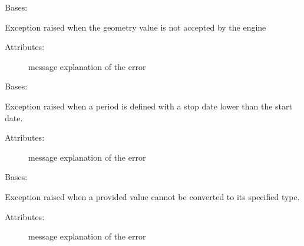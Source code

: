 \begin{fulllineitems}
\label{\detokenize{eboa.engine:eboa.engine.errors.WrongGeometry}}
Bases: {\hyperref[\detokenize{eboa.engine:eboa.engine.errors.Error}]{}}

Exception raised when the geometry value is not accepted by the engine
\begin{description}
\item[{Attributes:}] \leavevmode
message \textendash{} explanation of the error

\end{description}

\end{fulllineitems}


\begin{fulllineitems}
\label{\detokenize{eboa.engine:eboa.engine.errors.WrongPeriod}}
Bases: {\hyperref[\detokenize{eboa.engine:eboa.engine.errors.Error}]{}}

Exception raised when a period is defined with a stop date lower than the start date.
\begin{description}
\item[{Attributes:}] \leavevmode
message \textendash{} explanation of the error

\end{description}

\end{fulllineitems}


\begin{fulllineitems}
\label{\detokenize{eboa.engine:eboa.engine.errors.WrongValue}}
Bases: {\hyperref[\detokenize{eboa.engine:eboa.engine.errors.Error}]{}}

Exception raised when a provided value cannot be converted to its specified type.
\begin{description}
\item[{Attributes:}] \leavevmode
message \textendash{} explanation of the error

\end{description}

\end{fulllineitems}



